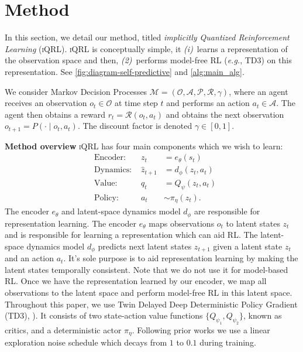 \documentclass{article}
\makeatletter
\theoremstyle{plain}
\theoremstyle{definition}
\theoremstyle{remark}
\newcommand{\our}{\textsc{iQRL}\xspace}
\newcommand{\eg}{\textit{e.g.\@}\xspace}
\makeatother
\begin{document}
\section{Method}
\label{sec:method}

In this section, we detail our method, titled \textit{implicitly Quantized Reinforcement Learning} (\our).
\our is conceptually simple, it {\em (i)}~learns a representation of the observation space and then,
{\em (2)}~performs model-free RL (\eg, TD3) on this representation.
See \cref{fig:diagram-self-predictive} and \cref{alg:main_alg}.

We consider Markov Decision Processes \citep[MDPs,][]{bellmanMarkovianDecisionProcess1957a} $\mathcal{M} = (\mathcal{O}, \mathcal{A}, \mathcal{P}, \mathcal{R}, \gamma)$,
where an agent receives an observation $o_{t} \in \mathcal{O}$ at time step $t$ and performs an action $a_{t} \in \mathcal{A}$.
The agent then obtains a reward $r_{t} = \mathcal{R} (o_{t}, a_{t})$ and obtains the next observation
$o_{t+1} = P(\cdot \mid o_{t}, a_{t})$.
The discount factor is denoted $\gamma \in [0, 1]$.



\textbf{Method overview}
\our has four main components which we wish to learn:
\begin{align}
&\text{Encoder: } & z_{t} &= e_{\theta} (s_{t}) \label{eq:encoder} \\
&\text{Dynamics: } & \hat{z}_{t+1} &= d_{\phi} (z_{t}, a_{t}) \label{eq:transition} \\
&\text{Value: } & q_{t} &= Q_{\psi} (z_{t}, a_{t}) \label{eq:value} \\
&\text{Policy: } & a_{t} &\sim \pi_{\eta} (z_{t}) . \label{eq:policy}
\end{align}
The encoder $e_{\theta}$  and latent-space dynamics model $d_{\phi}$ are responsible for representation learning.
The encoder $e_{\theta}$ maps observations $o_{t}$ to latent states $z_{t}$ and is responsible for learning a representation
which can aid RL.
The latent-space dynamics model $d_{\phi}$ predicts next latent states $z_{t+1}$ given a latent state $z_{t}$ and an action $a_{t}$.
It's sole purpose is to aid representation learning by making the latent states temporally consistent.
Note that we do not use it for model-based RL.
Once we have the representation learned by our encoder, we map all observations to the latent space and perform model-free RL
in this latent space.
Throughout this paper, we use Twin Delayed Deep Deterministic Policy Gradient
(TD3), \citep{fujimotoAddressingFunctionApproximation2018}).
It consists of two state-action value functions $\{Q_{\psi_{1}},Q_{\psi_{2}} \}$, known as critics, and a deterministic
actor $\pi_{\eta}$.
Following prior works \citep{yaratsMasteringVisualContinuous2021} we use a linear exploration noise schedule
which decays from $1$ to $0.1$ during training.
\end{document}
